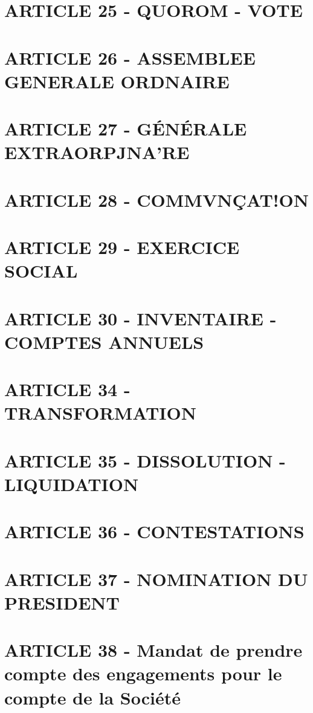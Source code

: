 \documentclass[a4paper, 11pt]{article}
\begin{document}
\section*{ARTICLE 25 - QUOROM - VOTE}

\section*{ARTICLE 26 - ASSEMBLEE GENERALE ORDNAIRE}

\section*{ARTICLE 27 - GÉNÉRALE EXTRAORPJNA'RE}

\section*{ARTICLE 28 - COMMVNÇAT!ON}

\section*{ARTICLE 29 - EXERCICE SOCIAL}

\section*{ARTICLE 30 - INVENTAIRE - COMPTES ANNUELS}

\section*{ARTICLE 34 - TRANSFORMATION}

\section*{ARTICLE 35 - DISSOLUTION - LIQUIDATION}

\section*{ARTICLE 36 - CONTESTATIONS}

\section*{ARTICLE 37 - NOMINATION DU PRESIDENT}

\section*{ARTICLE 38 - Mandat de prendre compte des engagements pour le compte de la Société}
\end{document}
